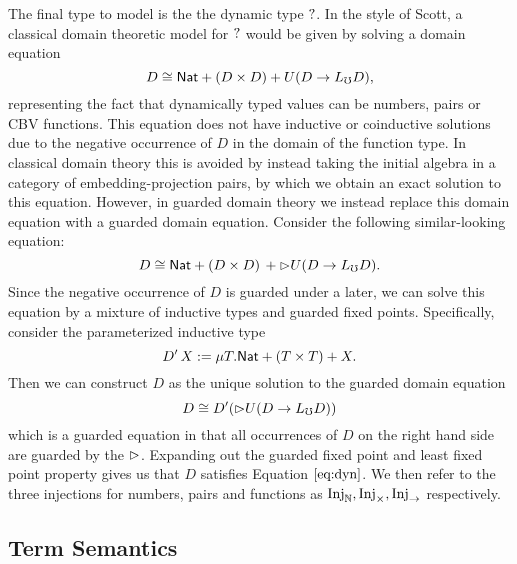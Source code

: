 The final type to model is the the dynamic type ${?}$.  In the style
of Scott, a classical domain theoretic model for ${?}$ would be given
by solving a domain equation
%
\[ D \cong \mathsf{Nat} + (D \times D) + U(D \to L_\mho D), \]
%
representing the fact that dynamically typed values can be numbers,
pairs or CBV functions. This equation does not have inductive or
coinductive solutions due to the negative occurrence of $D$ in the
domain of the function type. In classical domain theory this is
avoided by instead taking the initial algebra in a category of
embedding-projection pairs, by which we obtain an exact solution to
this equation. However, in guarded domain theory we instead replace this domain equation with a guarded domain equation.
Consider the following similar-looking equation:
%
\begin{equation}\label{eq:dyn}
D \cong \mathsf{Nat} + (D \times D)\, + {{\vartriangleright}} U(D \to L_\mho D).
\end{equation}
%
Since the negative occurrence of $D$ is guarded under a later, we can
solve this equation by a mixture of inductive types and guarded fixed
points. Specifically, consider the parameterized inductive type
%
\[ D'\, X := \mu T. \mathsf{Nat} + (T \times T) + X. \]
%
Then we can construct $D$ as the unique solution to the guarded domain equation
\[ D \cong D'({{\vartriangleright}} U(D \to L_\mho D)) \]
which is a guarded equation in that all occurrences of $D$ on the right hand side are guarded by the ${{\vartriangleright}}$.
%
Expanding out the guarded fixed point and least fixed point property
gives us that $D$ satisfies Equation $\ref{eq:dyn}$. 
%
We then refer to the three injections for numbers, pairs and functions
as $\text{Inj}_\mathbb{N}, \text{Inj}_\times, \text{Inj}_\to$ respectively.

\subsection{Term Semantics}\label{sec:term-interpretation}

